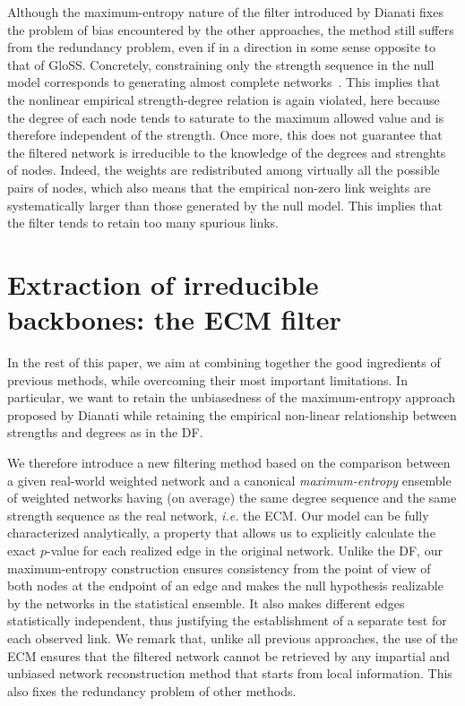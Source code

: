 \documentclass[aps,twocolumn,superscriptaddress]{revtex4-1}
\newcommand{\ie}{\emph{i.e.} }
\begin{document}
Although the maximum-entropy nature of the filter introduced by Dianati fixes the problem of bias encountered by the other approaches, the method still suffers from the redundancy problem, even if in a direction in some sense opposite to that of GloSS. 
Concretely, constraining only the strength sequence in the null model corresponds to generating almost complete networks~\cite{randomizing2,randomizing3}. 
This implies that the nonlinear empirical strength-degree relation is again violated, here because the degree of each node tends to saturate to the maximum allowed value and is therefore independent of the strength. 
Once more, this does not guarantee that the filtered network is irreducible to the knowledge of the degrees and strenghts of nodes.
Indeed, the weights are redistributed among virtually all the possible pairs of nodes, which also means that the empirical non-zero link weights are systematically larger than those generated by the null model.
This implies that the filter tends to retain too many spurious links.


\section{Extraction of irreducible backbones: the ECM filter\label{sec:model}}

In the rest of this paper, we aim at combining together the good ingredients of previous methods, while overcoming their most important limitations.
In particular, we want to retain the unbiasedness of the maximum-entropy approach proposed by Dianati while retaining the empirical non-linear relationship between strengths and degrees as in the DF.

We therefore introduce a new filtering method based on the comparison between a given real-world weighted network and a canonical \emph{maximum-entropy} ensemble of weighted networks having (on average) the same degree sequence and the same strength sequence as the real network, \ie the ECM.
Our model can be fully characterized analytically, a property that allows us to explicitly calculate the exact $p$-value for each realized edge in the original network.
Unlike the DF, our maximum-entropy construction ensures consistency from the point of view of both nodes at the endpoint of an edge and makes the null hypothesis realizable by the networks in the statistical ensemble.
It also makes different edges statistically independent, thus justifying the establishment of a separate test for each observed link.
We remark that, unlike all previous approaches, the use of the ECM ensures that the filtered network cannot be retrieved by any impartial and unbiased network reconstruction method that starts from local information. This also fixes the redundancy problem of other methods.
\end{document}
